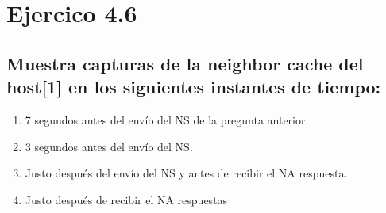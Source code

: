 \section{Ejercico 4.6}
\subsection{Muestra capturas de la neighbor cache del host[1] en los siguientes instantes de tiempo:}

\begin{enumerate}
    \item 7 segundos antes del envío del NS de la pregunta anterior.
    
    \item 3 segundos antes del envío del NS.
    \item Justo después del envío del NS y antes de recibir el NA respuesta.
    \item Justo después de recibir el NA respuestas
\end{enumerate}
